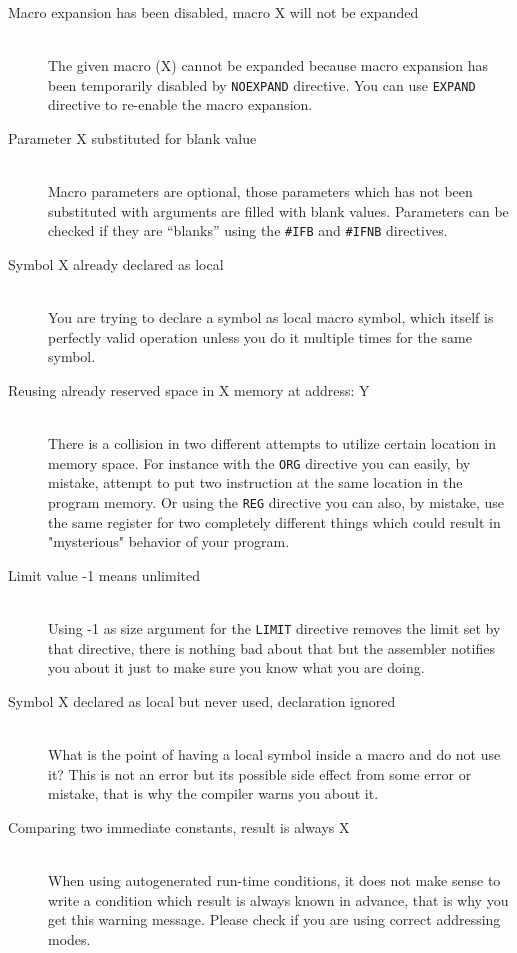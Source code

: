 \begin{description}
        \item[Macro expansion has been disabled, macro X will not be expanded]~\\
            The given macro (X) cannot be expanded because macro expansion has been temporarily disabled by \texttt{NOEXPAND} directive. You can use \texttt{EXPAND} directive to re-enable the macro expansion.
        \item[Parameter X substituted for blank value]~\\
            Macro parameters are optional, those parameters which has not been substituted with arguments are filled with blank values. Parameters can be checked if they are ``blanks'' using the \texttt{\#IFB} and \texttt{\#IFNB} directives.
        \item[Symbol X already declared as local]~\\
            You are trying to declare a symbol as local macro symbol, which itself is perfectly valid operation unless you do it multiple times for the same symbol.
        \item[Reusing already reserved space in X memory at address: Y]~\\
            There is a collision in two different attempts to utilize certain location in memory space. For instance with the \texttt{ORG} directive you can easily, by mistake, attempt to put two instruction at the same location in the program memory. Or using the \texttt{REG} directive you can also, by mistake, use the same register for two completely different things which could result in "mysterious" behavior of your program.
        \item[Limit value -1 means unlimited]~\\
            Using -1 as size argument for the \texttt{LIMIT} directive removes the limit set by that directive, there is nothing bad about that but the assembler notifies you about it just to make sure you know what you are doing.
        \item[Symbol X declared as local but never used, declaration ignored]~\\
            What is the point of having a local symbol inside a macro and do not use it? This is not an error but its possible side effect from some error or mistake, that is why the compiler warns you about it.
        \item[Comparing two immediate constants, result is always X]~\\
            When using autogenerated run-time conditions, it does not make sense to write a condition which result is always known in advance, that is why you get this warning message. Please check if you are using correct addressing modes.

\end{description}
